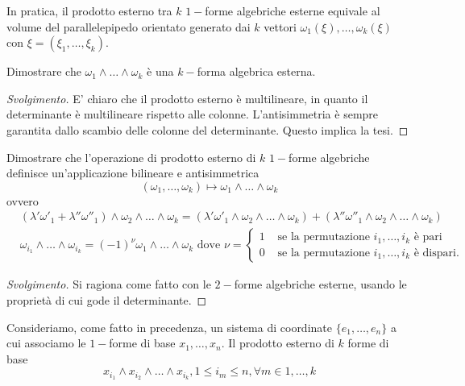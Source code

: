 In pratica, il prodotto esterno tra $k$ $1-$forme algebriche esterne equivale al volume del parallelepipedo orientato generato dai $k$ vettori $\omega_1(\xi), \ldots, \omega_k(\xi)$ con $\xi = (\xi_1, \ldots, \xi_k)$.
\begin{exercise}
    Dimostrare che $\omega_1 \wedge \ldots \wedge \omega_k$ è una $k-$forma algebrica esterna.
\end{exercise}
\begin{proof}[Svolgimento]
    E' chiaro che il prodotto esterno è multilineare, in quanto il determinante è multilineare rispetto alle colonne. L'antisimmetria è sempre garantita dallo scambio delle colonne del determinante. Questo implica la tesi.
\end{proof}
\begin{exercise}
    Dimostrare che l'operazione di prodotto esterno di $k$ $1-$forme algebriche definisce un'applicazione bilineare e antisimmetrica
    $$
        (\omega_1, \ldots, \omega_k) \mapsto \omega_1 \wedge \ldots \wedge \omega_k
    $$
    ovvero
    \begin{align*}
        &(\lambda' \omega'_1 + \lambda'' \omega''_1) \wedge \omega_2 \wedge \ldots \wedge \omega_k = (\lambda' \omega'_1 \wedge \omega_2 \wedge \ldots \wedge \omega_k) + (\lambda'' \omega''_1 \wedge \omega_2 \wedge \ldots \wedge \omega_k) \\
        &\omega_{i_1} \wedge \ldots \wedge \omega_{i_k} = (-1)^\nu \omega_1 \wedge \ldots \wedge \omega_k \text{ dove } \nu = \begin{cases}
            1 & \text{ se la permutazione } i_1, \ldots, i_k \text{ è pari} \\
            0 & \text{ se la permutazione } i_1, \ldots, i_k \text{ è dispari.}
        \end{cases}
    \end{align*}
\end{exercise}
\begin{proof}[Svolgimento]
    Si ragiona come fatto con le $2-$forme algebriche esterne, usando le proprietà di cui gode il determinante.
\end{proof}
Consideriamo, come fatto in precedenza, un sistema di coordinate $\{ e_1, \ldots, e_n \}$ a cui associamo le $1-$forme di base $x_1, \ldots, x_n$. Il prodotto esterno di $k$ forme di base
\begin{equation}
    x_{i_1} \wedge x_{i_2} \wedge \ldots \wedge x_{i_k}, 1 \leq i_m \leq n, \forall m \in {1, \ldots, k}
    \label{eq:k_form_prod}
\end{equation}
